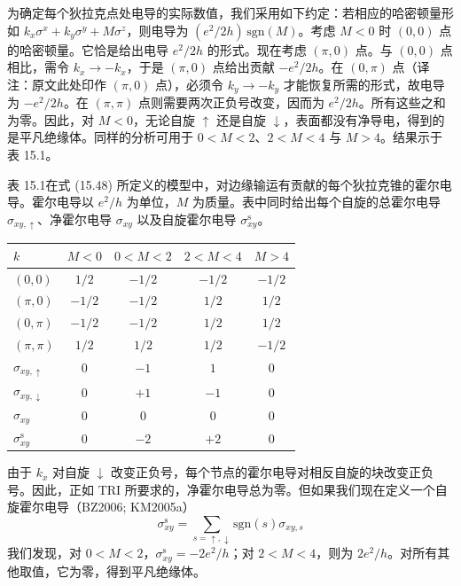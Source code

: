 为确定每个狄拉克点处电导的实际数值，我们采用如下约定：若相应的哈密顿量形如 $k_{x}\sigma^{x}+k_{y}\sigma^{y}+M\sigma^{z}$，则电导为 $(e^{2}/2h)\,\mathrm{sgn}(M)$。考虑 $M<0$ 时 $(0,0)$ 点的哈密顿量。它恰是给出电导 $e^{2}/2h$ 的形式。现在考虑 $(\pi,0)$ 点。与 $(0,0)$ 点相比，需令 $k_{x}\rightarrow-k_{x}$，于是 $(\pi,0)$ 点给出贡献 $-e^{2}/2h$。在 $(0,\pi)$ 点（译注：原文此处印作 $(\pi,0)$ 点），必须令 $k_{y}\rightarrow-k_{y}$ 才能恢复所需的形式，故电导为 $-e^{2}/2h$。在 $(\pi,\pi)$ 点则需要两次正负号改变，因而为 $e^{2}/2h$。所有这些之和为零。因此，对 $M<0$，无论自旋 $\uparrow$ 还是自旋 $\downarrow$，表面都没有净导电，得到的是平凡绝缘体。同样的分析可用于 $0<M<2$、$2<M<4$ 与 $M>4$。结果示于表 15.1。

\begin{center}
\small
表 15.1\quad 在式 (15.48) 所定义的模型中，对边缘输运有贡献的每个狄拉克锥的霍尔电导。霍尔电导以 $e^{2}/h$ 为单位，$M$ 为质量。表中同时给出每个自旋的总霍尔电导 $\sigma_{xy,\uparrow}$、净霍尔电导 $\sigma_{xy}$ 以及自旋霍尔电导 $\sigma_{xy}^{\mathrm{s}}$。

\vspace{4pt}
\begin{tabular}{lcccc}
\toprule
$k$ & $M<0$ & $0<M<2$ & $2<M<4$ & $M>4$ \\
\midrule
$(0,0)$ & $1/2$ & $-1/2$ & $-1/2$ & $-1/2$ \\
$(\pi,0)$ & $-1/2$ & $-1/2$ & $1/2$ & $1/2$ \\
$(0,\pi)$ & $-1/2$ & $-1/2$ & $1/2$ & $1/2$ \\
$(\pi,\pi)$ & $1/2$ & $1/2$ & $1/2$ & $-1/2$ \\
\midrule
$\sigma_{xy,\uparrow}$ & $0$ & $-1$ & $1$ & $0$ \\
$\sigma_{xy,\downarrow}$ & $0$ & $+1$ & $-1$ & $0$ \\
$\sigma_{xy}$ & $0$ & $0$ & $0$ & $0$ \\
$\sigma_{xy}^{\mathrm{s}}$ & $0$ & $-2$ & $+2$ & $0$ \\
\bottomrule
\end{tabular}
\end{center}

由于 $k_{x}$ 对自旋 $\downarrow$ 改变正负号，每个节点的霍尔电导对相反自旋的块改变正负号。因此，正如 TRI 所要求的，净霍尔电导总为零。但如果我们现在定义一个自旋霍尔电导（BZ2006; KM2005a）
\begin{equation*}
\sigma_{xy}^{\mathrm{s}}=\sum_{s=\uparrow,\downarrow}\mathrm{sgn}\left(s\right)\sigma_{xy,s}\tag{15.57}
\end{equation*}
我们发现，对 $0<M<2$，$\sigma_{xy}^{\mathrm{s}}=-2e^{2}/h$；对 $2<M<4$，则为 $2e^{2}/h$。对所有其他取值，它为零，得到平凡绝缘体。

